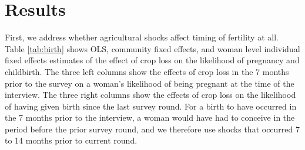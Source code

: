 \documentclass[letterpaper,12pt]{article}
\begin{document}
\section{Results}


First, we address whether agricultural shocks affect timing of fertility at all.
Table \ref{tab:birth} shows OLS, community fixed effects, and woman level individual 
fixed effects estimates of the effect of crop loss on the likelihood of pregnancy 
and childbirth.
The three left columns show the effects of crop loss in the 7 months prior to the
survey on a woman's likelihood of being pregnant at the time of the interview.
The three right columns show the effects of crop loss on the likelihood of having given 
birth since the last survey round. 
For a birth to have occurred in the 7 months prior to the interview, a woman would have
had to conceive in the period before the prior survey round, and we therefore use shocks
that occurred 7 to 14 months prior to current round.


\end{document}
